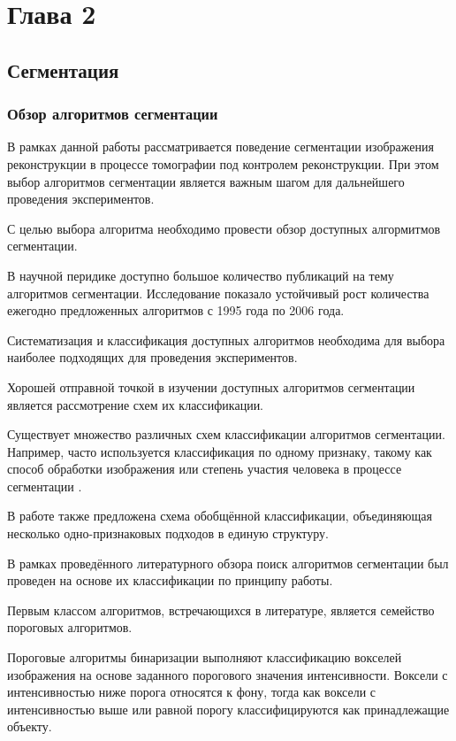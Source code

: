 \section{Глава 2}

\subsection{Сегментация}

\subsubsection{Обзор алгоритмов сегментации}

В рамках данной работы рассматривается поведение сегментации изображения реконструкции в процессе томографии под контролем реконструкции. При этом выбор алгоритмов сегментации является важным шагом для дальнейшего проведения экспериментов.

С целью выбора алгоритма необходимо провести обзор доступных алгормитмов сегментации.

В научной перидике доступно большое количество публикаций на тему алгоритмов сегментации. Исследование \cite{zhang2006advances} показало устойчивый рост количества ежегодно предложенных алгоритмов с 1995 года по 2006 года.

Систематизация и классификация доступных алгоритмов необходима для выбора наиболее подходящих для проведения экспериментов. 

Хорошей отправной точкой в изучении доступных алгоритмов сегментации является рассмотрение схем их классификации. 

Существует множество различных схем классификации алгоритмов сегментации. Например, часто используется классификация по одному признаку, такому как способ обработки изображения или степень участия человека в процессе сегментации \cite{wirjadi2007survey}.

В работе \cite{ханыков2018классификация} также предложена схема обобщённой классификации, объединяющая несколько одно-признаковых подходов в единую структуру.

В рамках проведённого литературного обзора поиск алгоритмов сегментации был проведен на основе их классификации по принципу работы.

Первым классом алгоритмов, встречающихся в литературе, является семейство пороговых алгоритмов. 

Пороговые алгоритмы бинаризации выполняют классификацию вокселей изображения на основе заданного порогового значения интенсивности. Воксели с интенсивностью ниже порога относятся к фону, тогда как воксели с интенсивностью выше или равной порогу классифицируются как принадлежащие объекту.

